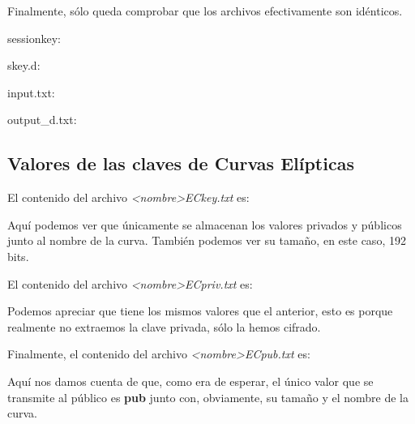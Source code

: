 \documentclass[a4paper, 11pt]{article}
\begin{document}
		Finalmente, sólo queda comprobar que los archivos efectivamente son idénticos.
		
		sessionkey:
		
		
		skey.d:
		
		
		input.txt:
		
		
		output\_d.txt:
		
	
	\subsection{Valores de las claves de Curvas Elípticas}
		El contenido del archivo \textit{<nombre>ECkey.txt} es:
		
		
		Aquí podemos ver que únicamente se almacenan los valores privados y públicos junto al nombre de la curva. También
		podemos ver su tamaño, en este caso, 192 bits.
		
		El contenido del archivo \textit{<nombre>ECpriv.txt} es:
		
		
		Podemos apreciar que tiene los mismos valores que el anterior, esto es porque realmente no extraemos la clave privada,
		sólo la hemos cifrado.
		
		Finalmente, el contenido del archivo \textit{<nombre>ECpub.txt} es:
		
		
		Aquí nos damos cuenta de que, como era de esperar, el único valor que se transmite al público es \textbf{pub} junto
		con, obviamente, su tamaño y el nombre de la curva.
\end{document}
